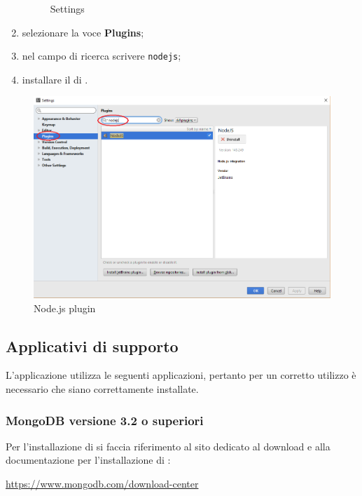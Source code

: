 \documentclass[12pt,a4paper]{article}
\begin{document}
\begin{enumerate}
\begin{center}
\begin{figure}[H]
				\caption{Settings}
			\end{figure}
		\end{center}

		\item selezionare la voce \textbf{Plugins};
		\item nel campo di ricerca scrivere \texttt{nodejs};
		\item installare il  di .
	\end{enumerate}
	\begin{center}
		\begin{figure}[H]
			\centering
			\includegraphics[max width=\textwidth]{../img/manualeSviluppatore/plugin.png}
			\caption{Node.js plugin}
		\end{figure}
	\end{center}
	
	\subsection{Applicativi di supporto} \label{app_supporto}
		
		L'applicazione \prj{} utilizza le seguenti applicazioni, pertanto per un corretto utilizzo è necessario che siano correttamente installate.
		\subsubsection{MongoDB versione 3.2 o superiori}
		Per l'installazione di  si faccia riferimento al sito dedicato al download e alla documentazione per l'installazione di :
		\begin{center} \url{https://www.mongodb.com/download-center}
		\end{center}
		
\end{document}
